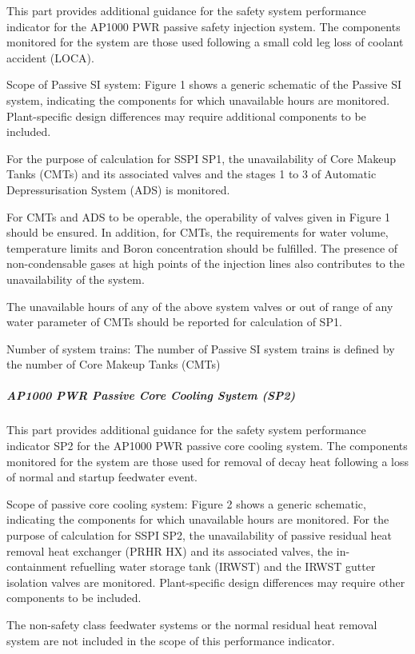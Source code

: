 This part provides additional guidance for the safety system
performance indicator for the AP1000 PWR passive safety injection
system. The components monitored for the system are those used
following a small cold leg loss of coolant accident (LOCA).

Scope of Passive SI system: Figure 1 shows a generic schematic of the
Passive SI system, indicating the components for which unavailable
hours are monitored. Plant-specific design differences may require
additional components to be included.

For the purpose of calculation for SSPI SP1, the unavailability of
Core Makeup Tanks (CMTs) and its associated valves and the stages 1 to
3 of Automatic Depressurisation System (ADS) is monitored.

For CMTs and ADS to be operable, the operability of valves given in
Figure 1 should be ensured. In addition, for CMTs, the requirements
for water volume, temperature limits and Boron concentration should be
fulfilled. The presence of non-condensable gases at high points of the
injection lines also contributes to the unavailability of the system.

The unavailable hours of any of the above system valves or out of
range of any water parameter of CMTs should be reported for
calculation of SP1.

Number of system trains:  The number of Passive SI system trains is defined by the number of Core Makeup Tanks (CMTs)

\subparagraph{AP1000 PWR Passive Core Cooling System (SP2)}

This part provides additional guidance for the safety system
performance indicator SP2 for the AP1000 PWR passive core cooling
system. The components monitored for the system are those used for
removal of decay heat following a loss of normal and startup feedwater
event.

Scope of passive core cooling system:  Figure 2 shows a generic
schematic, indicating the components for which unavailable hours are
monitored. For the purpose of calculation for SSPI SP2, the
unavailability of passive residual heat removal heat exchanger (PRHR
HX) and its associated valves, the in-containment refuelling water
storage tank (IRWST) and the IRWST gutter isolation valves are
monitored. Plant-specific design differences may require other
components to be included.

The non-safety class feedwater systems or the normal residual heat
removal system are not included in the scope of this performance
indicator.

